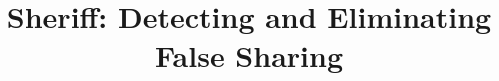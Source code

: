\documentclass[10pt]{sigplanconf}
\begin{document}


\title{Sheriff: Detecting and Eliminating False Sharing}

\authorinfo{}


\maketitle

\begin{comment}
Story:
Multi-core processors or NUMA are now widely used in order to avoid the physical limits of hardware. 
Multi-threaded is considered as one way to take full advantage of those computation resources. Unfornately, 
writing efficient multi-threaded program is not an easy task; 
false sharing problem can reduce the performance greatly, 
even worse, one program with serious false sharing problem can run slower on multi-core machine that that on 
on single-core machine with the same cpu frequency of every core.

This paper presents Sheriff, a system to detect those false sharing problem in multi-threaded c/c++ programs. 
Comparing to previous tool, Sheriff has a very low performance overhead, 
averagely the performance overhead is about 15\% in our experiments. 
For most programs, Sheriff can run almost the same speed or even faster than original program
using pthreads library. 
The second advantage of Sheriff is that there is no false positives at all. 
The false sharing problems reported by Sheriff are actual false sharing problems.

The third adanvatage of Sheriff is that Sheriff can pinpoint the code to cause the false sharing problems. 
For heap objects, Sheriff can point out the allocation site, 
then it is easy for programmer to fix the false sharing problem given the callsite information,
even for some one that are not familiar with the code. 
For global objects, Sheriff can point out those objects' name and length information which has false sharing problem.


\end{comment}
\end{document}
